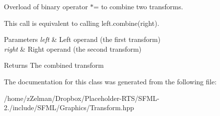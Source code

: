 Overload of binary operator $\ast$= to combine two transforms. 

This call is equivalent to calling left.\-combine(right).


\begin{DoxyParams}{Parameters}
{\em left} & Left operand (the first transform) \\
\hline
{\em right} & Right operand (the second transform)\\
\hline
\end{DoxyParams}
\begin{DoxyReturn}{Returns}
The combined transform 
\end{DoxyReturn}


The documentation for this class was generated from the following file\-:\begin{DoxyCompactItemize}
\item 
/home/z\-Zelman/\-Dropbox/\-Placeholder-\/\-R\-T\-S/\-S\-F\-M\-L-\/2./include/\-S\-F\-M\-L/\-Graphics/Transform.\-hpp\end{DoxyCompactItemize}
